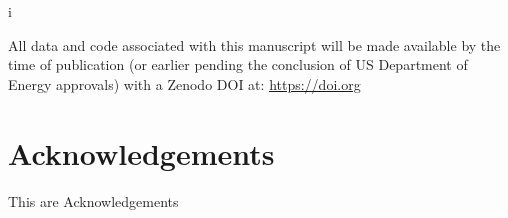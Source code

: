 i\documentclass{article}
\begin{document}
All data and code associated with this manuscript will be made available by the time of publication (or earlier pending the conclusion of US Department of Energy approvals) with a Zenodo DOI at: \href{https://doi.org}{https://doi.org}

\section{Acknowledgements}

This are Acknowledgements



\end{document}
